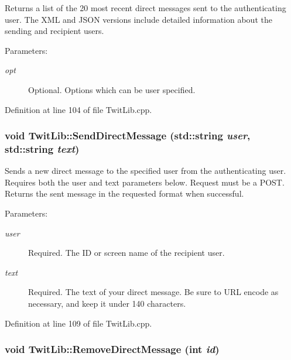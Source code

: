 Returns a list of the 20 most recent direct messages sent to the authenticating user. The XML and JSON versions include detailed information about the sending and recipient users. \begin{Desc}
\item[Parameters:]
\begin{description}
\item[{\em opt}]Optional. Options which can be user specified. \end{description}
\end{Desc}


Definition at line 104 of file TwitLib.cpp.\hypertarget{classTwitLib_3a02fb42122cdbb9ebc1c16aed7c2c66}{
\subsubsection{\setlength{\rightskip}{0pt plus 5cm}void TwitLib::SendDirectMessage (std::string {\em user}, \/  std::string {\em text})}}
\label{classTwitLib_3a02fb42122cdbb9ebc1c16aed7c2c66}


Sends a new direct message to the specified user from the authenticating user. Requires both the user and text parameters below. Request must be a POST. Returns the sent message in the requested format when successful. \begin{Desc}
\item[Parameters:]
\begin{description}
\item[{\em user}]Required. The ID or screen name of the recipient user. \item[{\em text}]Required. The text of your direct message. Be sure to URL encode as necessary, and keep it under 140 characters. \end{description}
\end{Desc}


Definition at line 109 of file TwitLib.cpp.\hypertarget{classTwitLib_8e443d79afbb1dc30cb0616c8bfb9ab8}{
\subsubsection{\setlength{\rightskip}{0pt plus 5cm}void TwitLib::RemoveDirectMessage (int {\em id})}}
\label{classTwitLib_8e443d79afbb1dc30cb0616c8bfb9ab8}


